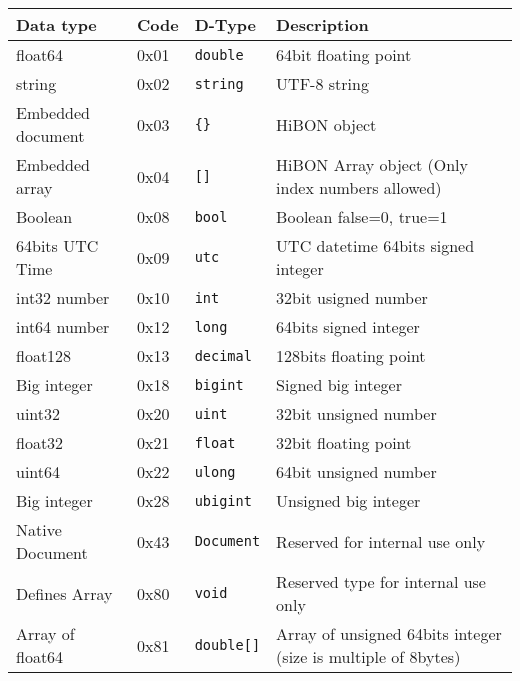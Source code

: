 \begin{table}[H]
\begin{center}
\begin{tabular}{|p{3.5cm}|l|p{1.5cm}|p{8cm}|}
      \hline
      Data type & Code & D-Type & Description \\
      \hline
      float64 & 0x01 & \texttt{double} & 64bit floating point \\
      \hline
      string & 0x02 & \texttt{string} & UTF-8 string \\
      \hline
      Embedded document & 0x03 & \texttt{\{\}} & HiBON object \\
      \hline
      Embedded array & 0x04 & \texttt{[]} & HiBON Array object (Only index numbers allowed) \\
      \hline
      Boolean & 0x08 & \texttt{bool} & Boolean false=0, true=1 \\
      \hline
      64bits UTC Time & 0x09 & \texttt{utc} & UTC datetime 64bits signed integer \\
      \hline
      int32 number & 0x10 & \texttt{int} & 32bit usigned number \\
      \hline
      int64 number & 0x12 & \texttt{long} & 64bits signed integer \\
      \hline
      float128 & 0x13 & \texttt{decimal} & 128bits floating point \\
      \hline
      Big integer & 0x18 & \texttt{bigint} & Signed big integer \\
      \hline
      uint32 & 0x20 & \texttt{uint} & 32bit unsigned number \\
      \hline
      float32 & 0x21 & \texttt{float} & 32bit floating point \\
      \hline
      uint64 & 0x22 & \texttt{ulong} & 64bit unsigned number \\
      \hline
      Big integer & 0x28 & \texttt{ubigint} & Unsigned big integer \\
      \hline
      Native Document  & 0x43 & \texttt{Document} & Reserved for internal use only \\
      \hline
      Defines Array    & 0x80 & \texttt{void} & Reserved type for internal use only \\
      \hline
      Array of float64 & 0x81 & \texttt{double[]} & Array of unsigned 64bits integer (size is multiple of 8bytes) \\

\end{tabular}
\end{center}
\end{table}
